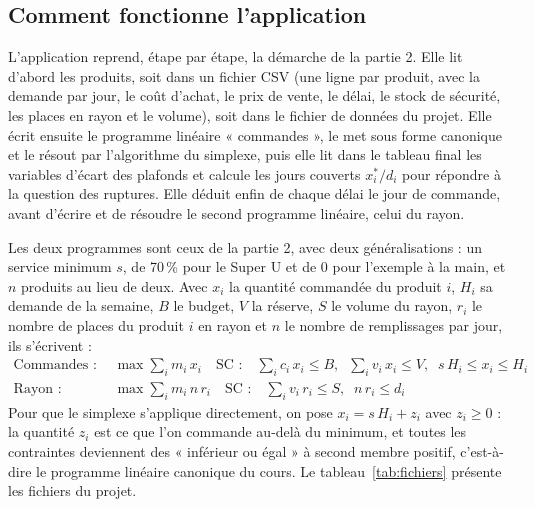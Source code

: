 \documentclass[11pt,a4paper]{article}
\begin{document}
\subsection{Comment fonctionne l'application}
L'application reprend, étape par étape, la démarche de la partie 2. Elle lit d'abord les
produits, soit dans un fichier CSV (une ligne par produit, avec la demande par jour, le coût
d'achat, le prix de vente, le délai, le stock de sécurité, les places en rayon et le volume),
soit dans le fichier de données du projet. Elle écrit ensuite le programme linéaire
« commandes », le met sous forme canonique et le résout par l'algorithme du simplexe, puis
elle lit dans le tableau final les variables d'écart des plafonds et calcule les jours
couverts $x_i^{*} / d_i$ pour répondre à la question des ruptures. Elle déduit enfin de chaque
délai le jour de commande, avant d'écrire et de résoudre le second programme linéaire, celui
du rayon.

Les deux programmes sont ceux de la partie 2, avec deux généralisations : un service minimum
$s$, de 70\,\% pour le Super U et de 0 pour l'exemple à la main, et $n$ produits au lieu de
deux. Avec $x_i$ la quantité commandée du produit $i$, $H_i$ sa demande de la semaine, $B$ le
budget, $V$ la réserve, $S$ le volume du rayon, $r_i$ le nombre de places du produit $i$ en
rayon et $n$ le nombre de remplissages par jour, ils s'écrivent :
\begin{align*}
\text{Commandes :}\quad & \max \sum_i m_i\,x_i
  \quad\text{SC :}\quad \sum_i c_i\,x_i \le B,\;\; \sum_i v_i\,x_i \le V,\;\;
  s\,H_i \le x_i \le H_i\\
\text{Rayon :}\quad & \max \sum_i m_i\,n\,r_i
  \quad\text{SC :}\quad \sum_i v_i\,r_i \le S,\;\; n\,r_i \le d_i
\end{align*}
Pour que le simplexe s'applique directement, on pose $x_i = s\,H_i + z_i$ avec $z_i \ge 0$ : la
quantité $z_i$ est ce que l'on commande au-delà du minimum, et toutes les contraintes
deviennent des « inférieur ou égal » à second membre positif, c'est-à-dire le programme
linéaire canonique du cours. Le tableau~\ref{tab:fichiers} présente les fichiers du projet.
\end{document}
